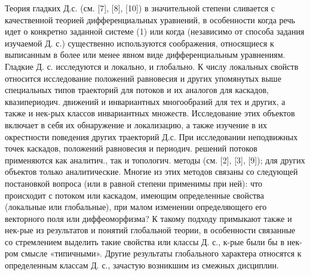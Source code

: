 \documentclass[10pt]{article}
\begin{document}
Теория гладких Д.с. (см. [7], [8], [10]) в значительной степени сливается с качественной теорией дифференциальных уравнений, в особенности когда речь идет о конкретно заданной системе (1) или когда (независимо от способа задания изучаемой Д. с.) существенно используются соображения, относящиеся к выписанным в более или менее явном виде дифференциальным уравнениям. Гладкие Д. с. исследуются и локально, и глобально. К числу локальных свойств относится исследование положений равновесия и других упомянутых выше специальных типов траекторий для потоков и их аналогов для каскадов, квазипериодич. движений и инвариантных многообразий для тех и других, а также и нек-рых классов инвариантных множеств. Исследование этих объектов включает в себя их обнаружение и локализацию, а также изучение в их окрестности поведения других траекторий Д.с. При исследовании неподвижных точек каскадов, положений равновесия и периодич. решений потоков применяются как аналитич., так и топологич. методы (см. [2], [3], [9]); для других объектов только аналитические. Многие из этих методов связаны со следующей постановкой вопроса (или в равной степени применимы при ней): что происходит с потоком или каскадом, имеющим определенные свойства (локальные или глобальные), при малом изменении определяющего его векторного поля или диффеоморфизма? К такому подходу примыкают также и нек-рые из результатов и понятий глобальной теории, в особенности связанные со стремлением выделить такие свойства или классы Д. с., к-рые были бы в нек-ром смысле «типичными». Другие результаты глобального характера относятся к определенным классам Д. с., зачастую возникшим из смежных дисциплин.
\end{document}
